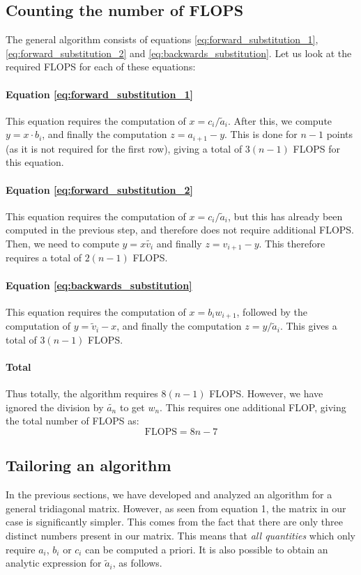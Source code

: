 \documentclass[a4paper, 10pt]{article}
\begin{document}
\subsection*{Counting the number of FLOPS}
The general algorithm consists of equations \ref{eq:forward_substitution_1}, \ref{eq:forward_substitution_2} and \ref{eq:backwards_substitution}. Let us look at the required FLOPS for each of these equations:
\paragraph*{Equation \ref{eq:forward_substitution_1}}
This equation requires the computation of $x=c_i/\tilde{a}_{i}$. After this, we compute $y=x\cdot b_i$, and finally the computation $z=a_{i+1}-y$. This is done for $n-1$ points (as it is not required for the first row), giving a total of $3(n-1)$ FLOPS for this equation.
\paragraph*{Equation \ref{eq:forward_substitution_2}}
This equation requires the computation of $x=c_i/\tilde{a}_i$, but this has already been computed in the previous step, and therefore does not require additional FLOPS. Then, we need to compute $y=x\tilde{v_i}$ and finally $z=v_{i+1}-y$. This therefore requires a total of $2(n-1)$ FLOPS.
\paragraph*{Equation \ref{eq:backwards_substitution}}
This equation requires the computation of $x=b_iw_{i+1}$, followed by the computation of $y=\tilde{v}_i-x$, and finally the computation $z=y/\tilde{a}_i$. This gives a total of $3(n-1)$ FLOPS.
\paragraph*{Total}
Thus totally, the algorithm requires $8(n-1)$ FLOPS. However, we have ignored the division by $\tilde{a_n}$ to get $w_n$. This requires one additional FLOP, giving the total number of FLOPS as:
$$\mathrm{FLOPS}=8n-7$$
\subsection*{Tailoring an algorithm}
In the previous sections, we have developed and analyzed an algorithm for a general tridiagonal matrix. However, as seen from equation 1, the matrix in our case is significantly simpler. This comes from the fact that there are only three distinct numbers present in our matrix. This means that \textit{all quantities} which only require $a_i$, $b_i$ or $c_i$ can be computed a priori. It is also possible to obtain an analytic expression for $\tilde{a}_i$, as follows.
\end{document}
